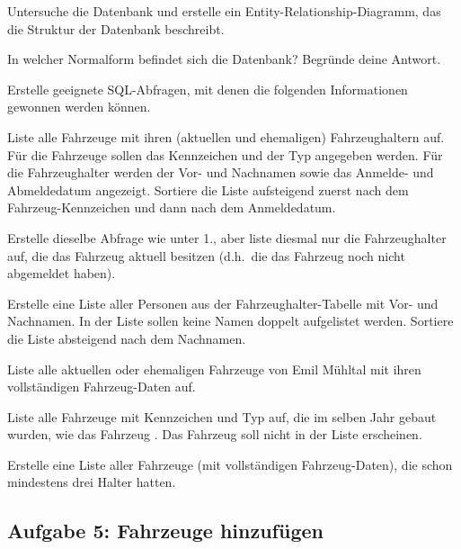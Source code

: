 \begin{compactenum}[a)]
\item Untersuche die Datenbank und erstelle ein Entity-Relationship-Diagramm,
das die Struktur der Datenbank beschreibt.

\item In welcher Normalform befindet sich die Datenbank? Begründe deine Antwort.

\item Erstelle geeignete SQL-Abfragen, mit denen die folgenden Informationen
gewonnen werden können.
\begin{compactenum}[1.]
\item Liste alle Fahrzeuge mit ihren (aktuellen und ehemaligen) Fahrzeughaltern
auf. Für die Fahrzeuge sollen das Kennzeichen und der Typ angegeben werden. Für
die Fahrzeughalter werden der Vor- und Nachnamen sowie das Anmelde- und
Abmeldedatum angezeigt. Sortiere die Liste aufsteigend zuerst nach dem
Fahrzeug-Kennzeichen und dann nach dem Anmeldedatum.

\item Erstelle dieselbe Abfrage wie unter 1., aber liste diesmal nur die
Fahrzeughalter auf, die das Fahrzeug aktuell besitzen (d.h.\ die das Fahrzeug
noch nicht abgemeldet haben).

\item Erstelle eine Liste aller Personen aus der Fahrzeughalter-Tabelle mit Vor-
und Nachnamen. In der Liste sollen keine Namen doppelt aufgelistet werden.
Sortiere die Liste absteigend nach dem Nachnamen.

\item Liste alle aktuellen oder ehemaligen Fahrzeuge von Emil Mühltal mit ihren
 vollständigen Fahrzeug-Daten auf.

\item Liste alle Fahrzeuge mit Kennzeichen und Typ auf, die im selben Jahr
gebaut wurden, wie das Fahrzeug . Das Fahrzeug
 soll nicht in der Liste erscheinen.

\item Erstelle eine Liste aller Fahrzeuge (mit vollständigen Fahrzeug-Daten),
die schon mindestens drei Halter hatten.
\end{compactenum}
\end{compactenum}


\subsection{Aufgabe 5: Fahrzeuge hinzufügen}

